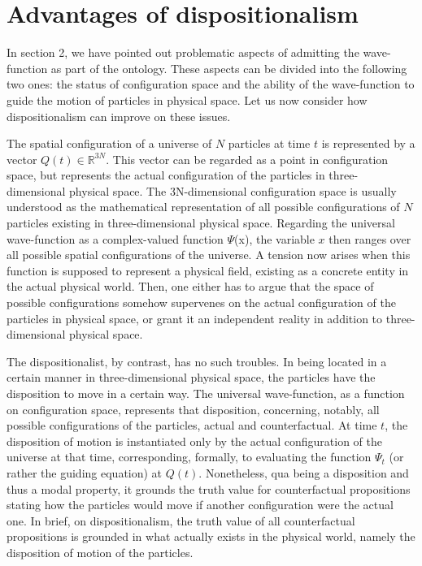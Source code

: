 \documentclass[12pt]{article}
\newcommand{\R}{\mathbb R}
\theoremstyle{definition}
\begin{document}
\section{Advantages of dispositionalism}

In section 2, we have pointed out problematic aspects of admitting the wave-function as part of the ontology. These aspects can be divided into the following two ones: the status of configuration space and the ability of the wave-function to guide the motion of particles in physical space. Let us now consider how dispositionalism can improve on these issues.

The spatial configuration of a universe of $N$ particles at time $t$ is represented by a vector $Q(t) \in \R^{3N}$. This vector can be regarded as a point in configuration space, but represents the actual configuration of the particles in three-dimensional physical space. The 3N-dimensional configuration space is usually understood as the mathematical representation of all possible configurations of $N$ particles existing in three-dimensional physical space. Regarding the universal wave-function as a complex-valued function $\Psi$(x), the variable $x$ then ranges over all possible spatial configurations of the universe. A tension now arises when this function is supposed to represent a physical field, existing as a concrete entity in the actual physical world. Then, one either has to argue that the space of possible configurations somehow supervenes on the actual configuration of the particles in physical space, or grant it an independent reality in addition to three-dimensional physical space.

The dispositionalist, by contrast, has no such troubles. In being located in a certain manner in three-dimensional physical space, the particles have the disposition to move in a certain way. The universal wave-function, as a function on configuration space, represents that disposition, concerning, notably, all possible configurations of the particles, actual and counterfactual. At time $t$, the disposition of motion is instantiated only by the actual configuration of the universe at that time, corresponding, formally, to evaluating the function $\Psi_t$ (or rather the guiding equation) at $Q(t)$. Nonetheless, qua being a disposition and thus a modal property, it grounds the truth value for counterfactual propositions stating how the particles would move if another configuration were the actual one. In brief, on dispositionalism, the truth value of all counterfactual propositions is grounded in what actually exists in the physical world, namely the disposition of motion of the particles.
\end{document}
